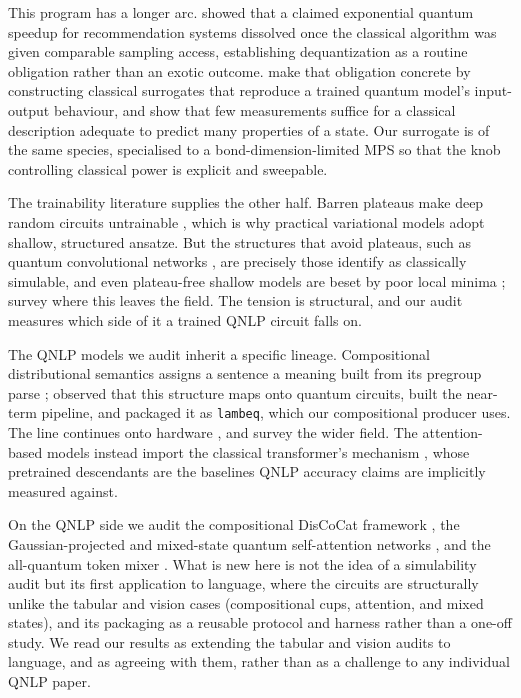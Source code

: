 \documentclass[10pt]{article}
\begin{document}
This program has a longer arc. \citet{tang2019} showed that a claimed exponential quantum speedup
for recommendation systems dissolved once the classical algorithm was given comparable sampling
access, establishing dequantization as a routine obligation rather than an exotic outcome.
\citet{schreiber2023} make that obligation concrete by constructing classical surrogates that
reproduce a trained quantum model's input-output behaviour, and \citet{huang2020} show that few
measurements suffice for a classical description adequate to predict many properties of a
state. Our surrogate is of the same species, specialised to a
bond-dimension-limited MPS so that the knob controlling classical power is explicit and sweepable.

The trainability literature supplies the other half. Barren plateaus make deep random circuits
untrainable \citep{mcclean2018}, which is why practical variational models
\citep{peruzzo2014,cerezo2021} adopt shallow, structured ansatze. But the structures that avoid
plateaus, such as quantum convolutional networks \citep{cong2019,pesah2021}, are precisely those
\citet{cerezo2025} identify as classically simulable, and even plateau-free shallow models are
beset by poor local minima \citep{anschuetz2022}; \citet{larocca2025} survey where this leaves the
field. The tension is structural, and our audit measures which side of it a trained QNLP circuit
falls on.

The QNLP models we audit inherit a specific lineage. Compositional distributional semantics
assigns a sentence a meaning built from its pregroup parse \citep{coecke2010}; \citet{zeng2016}
observed that this structure maps onto quantum circuits, \citet{meichanetzidis2021} built the
near-term pipeline, and \citet{kartsaklis2021} packaged it as \texttt{lambeq}, which our
compositional producer uses. The line continues onto hardware \citep{duneau2024}, and
\citet{nausheen2025} survey the wider field. The attention-based models instead import the
classical transformer's mechanism \citep{vaswani2017}, whose pretrained descendants
\citep{devlin2019} are the baselines QNLP accuracy claims are implicitly measured against.

On the QNLP side we audit the compositional DisCoCat framework \citep{lorenz2021}, the
Gaussian-projected and mixed-state quantum self-attention networks \citep{li2022,chen2024}, and the
all-quantum token mixer \citep{claqs2025}. What is new here is not the idea of a simulability audit
but its first application to language, where the circuits are structurally unlike the tabular and vision cases (compositional
cups, attention, and mixed states), and its packaging as a reusable protocol and harness rather
than a one-off study. We read our results as extending the tabular and vision audits to language,
and as agreeing with them, rather than as a challenge to any individual QNLP paper.
\end{document}
